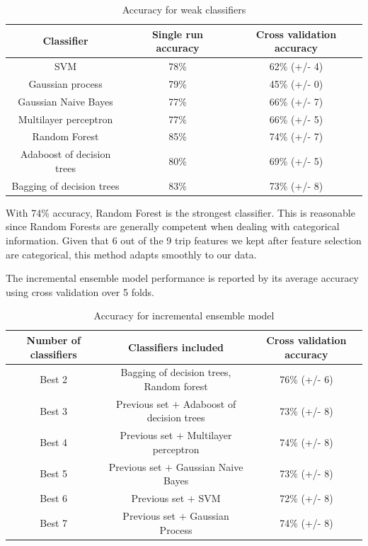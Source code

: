 \documentclass{article}
\begin{document}
\begin{table}[H]
\centering
\begin{tabular}{||c|c|c||}
\hline
\textbf{Classifier} & \textbf{Single run accuracy} & \textbf{Cross validation accuracy} \\ [0.5ex] 
\hline \hline
SVM & 78\% & 62\% (+/- 4)\\
Gaussian process & 79\% & 45\% (+/- 0)\\
Gaussian Naive Bayes & 77\% & 66\% (+/- 7)\\
Multilayer perceptron & 77\% & 66\% (+/- 5)\\
Random Forest & 85\% & 74\% (+/- 7)\\
Adaboost of decision trees & 80\% & 69\% (+/- 5)\\
Bagging of decision trees & 83\% & 73\% (+/- 8)\\ [1ex]
\hline 
\end{tabular}
\caption{Accuracy for weak classifiers}
\label{table:weakClassifiers}
\end{table}

With 74\% accuracy, Random Forest is the strongest classifier. This is reasonable since Random Forests are generally competent when dealing with categorical information. Given that 6 out of the 9 trip features we kept after feature selection are categorical, this method adapts smoothly to our data. 

The incremental ensemble model performance is reported by its average accuracy using cross validation over 5 folds. 

\begin{table}[H]
\centering
\begin{tabular}{||c|c|c||}
\hline
\textbf{Number of classifiers} & \textbf{Classifiers included} & \textbf{Cross validation accuracy} \\ [0.5ex] 
\hline \hline
Best 2 & {Bagging of decision trees, Random forest} & 76\% (+/- 6)\\
Best 3 & Previous set $+$ {Adaboost of decision trees} & 73\% (+/- 8)\\
Best 4 & Previous set $+$ {Multilayer perceptron} & 74\% (+/- 8)\\
Best 5 & Previous set $+$ {Gaussian Naive Bayes} & 73\% (+/- 8)\\
Best 6 & Previous set $+$ {SVM} & 72\% (+/- 8)\\
Best 7 & Previous set $+$ {Gaussian Process} & 74\% (+/- 8)\\ [1ex]
\hline 
\end{tabular}
\caption{Accuracy for incremental ensemble model}
\label{table:ensembleModels}
\end{table}
\end{document}
